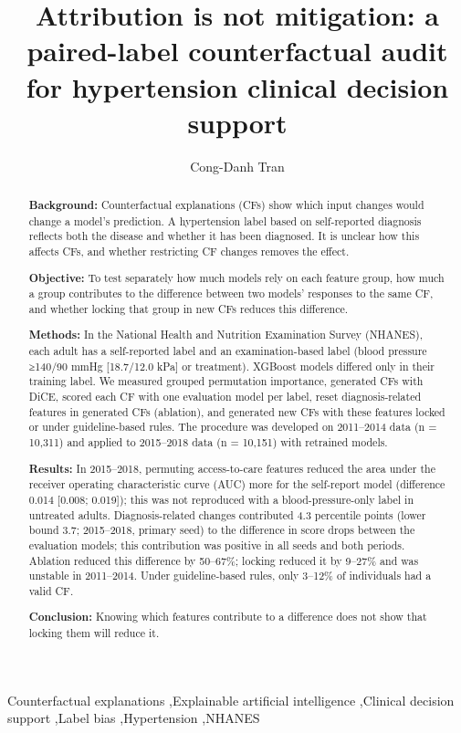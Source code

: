 \documentclass[preprint,review,12pt,times]{elsarticle}
\begin{document}
\begin{frontmatter}
\title{Attribution is not mitigation: a paired-label counterfactual audit for hypertension clinical decision support}
\author[uit,vnu]{Cong-Danh Tran}
\makeatletter\g@addto@macro{}\makeatother
{}
\begin{abstract}
\textbf{Background:} Counterfactual explanations (CFs) show which input changes would change a model's prediction. A hypertension label based on self-reported diagnosis reflects both the disease and whether it has been diagnosed. It is unclear how this affects CFs, and whether restricting CF changes removes the effect.

\textbf{Objective:} To test separately how much models rely on each feature group, how much a group contributes to the difference between two models' responses to the same CF, and whether locking that group in new CFs reduces this difference.

\textbf{Methods:} In the National Health and Nutrition Examination Survey (NHANES), each adult has a self-reported label and an examination-based label (blood pressure ≥140/90 mmHg [18.7/12.0 kPa] or treatment). XGBoost models differed only in their training label. We measured grouped permutation importance, generated CFs with DiCE, scored each CF with one evaluation model per label, reset diagnosis-related features in generated CFs (ablation), and generated new CFs with these features locked or under guideline-based rules. The procedure was developed on 2011–2014 data (n = 10,311) and applied to 2015–2018 data (n = 10,151) with retrained models.

\textbf{Results:} In 2015–2018, permuting access-to-care features reduced the area under the receiver operating characteristic curve (AUC) more for the self-report model (difference 0.014 [0.008; 0.019]); this was not reproduced with a blood-pressure-only label in untreated adults. Diagnosis-related changes contributed 4.3 percentile points (lower bound 3.7; 2015–2018, primary seed) to the difference in score drops between the evaluation models; this contribution was positive in all seeds and both periods. Ablation reduced this difference by 50–67\%; locking reduced it by 9–27\% and was unstable in 2011–2014. Under guideline-based rules, only 3–12\% of individuals had a valid CF.

\textbf{Conclusion:} Knowing which features contribute to a difference does not show that locking them will reduce it.
\end{abstract}

\begin{keyword}
Counterfactual explanations \sep Explainable artificial intelligence \sep Clinical decision support \sep Label bias \sep Hypertension \sep NHANES
\end{keyword}
\end{frontmatter}
\end{document}
